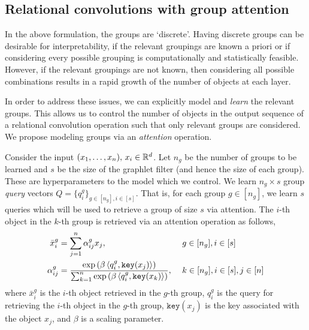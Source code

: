 \subsection{Relational convolutions with group attention}\label{ssec:relconv_groupattn}

In the above formulation, the groups are `discrete'. Having discrete groups can be desirable for interpretability, if the relevant groupings are known a priori or if considering every possible grouping is computationally and statistically feasible. However, if the relevant groupings are not known, then considering all possible combinations results in a rapid growth of the number of objects at each layer.

In order to address these issues, we can explicitly model and \textit{learn} the relevant groups. This allows us to control the number of objects in the output sequence of a relational convolution operation such that only relevant groups are considered. We propose modeling groups via an \textit{attention} operation.

Consider the input $(x_1, \ldots, x_n),\, x_i \in \mathbb{R}^d$. Let $n_g$ be the number of groups to be learned and $s$ be the size of the graphlet filter (and hence the size of each group). These are hyperparameters to the model which we control. We learn $n_g \times s$ group \textit{query} vectors $Q = \{q_{i}^{g}\}_{g \in [n_g], i \in [s]}$. That is, for each group $g \in [n_g]$, we learn $s$ queries which will be used to retrieve a group of size $s$ via attention. The $i$-th object in the $k$-th group is retrieved via an attention operation as follows,
\begin{equation}\label{eq:group_attn}
    \begin{aligned}
        \bar{x}_{i}^{g} &= \sum_{j = 1}^{n} \alpha_{ij}^{g} x_j, \ &&g \in [n_g],  i \in [s]\\
        \alpha_{ij}^{g} &= \frac{\exp\paren{\beta \iprod{q_i^g}{\mathtt{key}(x_j)}}}{\sum_{k = 1}^{n}{\exp\paren{\beta \iprod{q_i^g}{\mathtt{key}(x_k)}}}}, \ &&k \in [n_g], i \in [s], j \in [n]
    \end{aligned}
\end{equation}
where $\bar{x}_{i}^{g}$ is the $i$-th object retrieved in the $g$-th group, $q_{i}^{g}$ is the query for retrieving the $i$-th object in the $g$-th group, $\mathtt{key}(x_j)$ is the key associated with the object $x_j$, and $\beta$ is a scaling parameter. %

